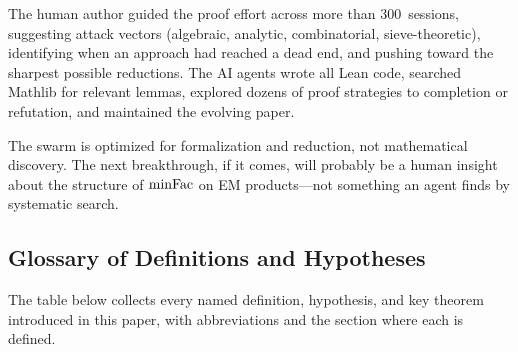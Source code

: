 The human author guided the proof effort across more than 300~sessions, suggesting
attack vectors (algebraic, analytic, combinatorial, sieve-theoretic),
identifying when an approach had reached a dead end, and pushing toward
the sharpest possible reductions.  The AI agents wrote all Lean code,
searched Mathlib for relevant lemmas, explored dozens of proof strategies
to completion or refutation, and maintained the evolving paper.

The swarm is optimized for formalization and reduction, not mathematical
discovery.  The next breakthrough, if it comes, will probably be a human
insight about the structure of $\mathrm{minFac}$ on EM products---not something
an agent finds by systematic search.

\subsection{Glossary of Definitions and Hypotheses}
\label{sec:glossary}

The table below collects every named definition, hypothesis, and key
theorem introduced in this paper, with abbreviations and the section
where each is defined.

